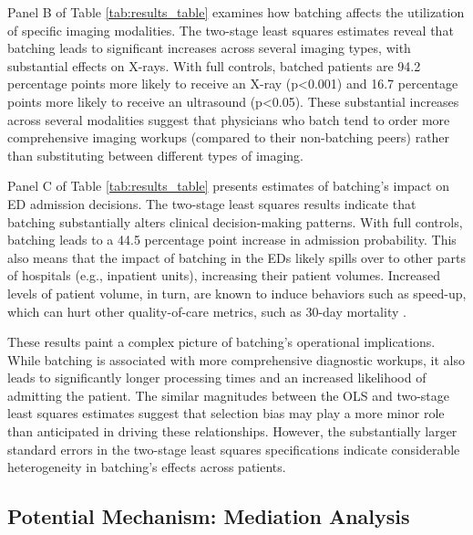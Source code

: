 \documentclass[,,nonblindrev]{informs}
\begin{document}
Panel B of Table \ref{tab:results_table} examines how batching affects
the utilization of specific imaging modalities. The two-stage least
squares estimates reveal that batching leads to significant increases
across several imaging types, with substantial effects on X-rays. With
full controls, batched patients are 94.2 percentage points more likely
to receive an X-ray (p\textless0.001) and 16.7 percentage points more
likely to receive an ultrasound (p\textless0.05). These substantial
increases across several modalities suggest that physicians who batch
tend to order more comprehensive imaging workups (compared to their
non-batching peers) rather than substituting between different types of
imaging.

Panel C of Table \ref{tab:results_table} presents estimates of
batching's impact on ED admission decisions. The two-stage least squares
results indicate that batching substantially alters clinical
decision-making patterns. With full controls, batching leads to a 44.5
percentage point increase in admission probability. This also means that
the impact of batching in the EDs likely spills over to other parts of
hospitals (e.g., inpatient units), increasing their patient volumes.
Increased levels of patient volume, in turn, are known to induce
behaviors such as speed-up, which can hurt other quality-of-care
metrics, such as 30-day mortality \citep{Song2019}.

These results paint a complex picture of batching's operational
implications. While batching is associated with more comprehensive
diagnostic workups, it also leads to significantly longer processing
times and an increased likelihood of admitting the patient. The similar
magnitudes between the OLS and two-stage least squares estimates suggest
that selection bias may play a more minor role than anticipated in
driving these relationships. However, the substantially larger standard
errors in the two-stage least squares specifications indicate
considerable heterogeneity in batching's effects across patients.

\subsection{Potential Mechanism: Mediation
Analysis}\label{potential-mechanism-mediation-analysis}
\end{document}
